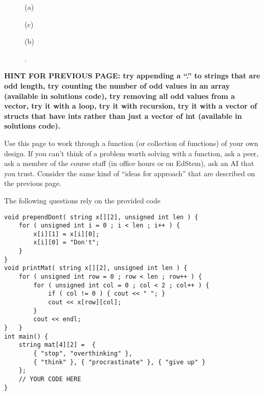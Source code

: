\documentclass[addpoints,12pt]{exam}
\newcommand{\Soln}[1]{{\color{red}{SOLUTION: #1}}}%
\newcommand{\SolnNo}{\Soln{No solutions provided for this sample, it is up to you to verify your understanding of the topic using the resources that are available to you. Ask your peers, use office hours, use \hyperlink{https://edstem.org/us/courses/72170/discussion}{EdStem}.}}
\newcommand{\twocol}[2]{\begin{figure}[!htb]
    \centering
    \begin{minipage}{.5\textwidth}
    #1
    \end{minipage}%
    \begin{minipage}{0.5\textwidth}
     #2
    \end{minipage}
\end{figure}
}
\begin{document}
\begin{questions}
    \twocol{(a)}{(c)}
    \vfill
    \twocol{(b)}{.}
    \vfill
    \newpage
    \textbf{HINT FOR PREVIOUS PAGE: try appending a ``.'' to strings that are odd length, try counting the number of odd values in an array (available in solutions code), try removing all odd values from a vector, try it with a loop, try it with recursion, try it with a vector of structs that have ints rather than just a vector of int (available in solutions code).}


 Use this page to work through a function (or collection of functions) of your own design. If you can't think of a problem worth solving with a function, ask a peer, ask a member of the course staff (in office hours or on EdStem), ask an AI that you trust. Consider the same kind of ``ideas for approach'' that are described on the previous page.
    \newpage

 The following questions rely on the provided code
\begin{verbatim}
void prependDont( string x[][2], unsigned int len ) {
    for ( unsigned int i = 0 ; i < len ; i++ ) {
        x[i][1] = x[i][0];
        x[i][0] = "Don't";
    }
}
void printMat( string x[][2], unsigned int len ) {
    for ( unsigned int row = 0 ; row < len ; row++ ) {
        for ( unsigned int col = 0 ; col < 2 ; col++ ) {
            if ( col != 0 ) { cout << " "; }
            cout << x[row][col];
        }
        cout << endl;
}   }
int main() {
    string mat[4][2] =  {
        { "stop", "overthinking" },
        { "think" }, { "procrastinate" }, { "give up" }
    };
    // YOUR CODE HERE
}
\end{verbatim}


\end{questions}
\end{document}
